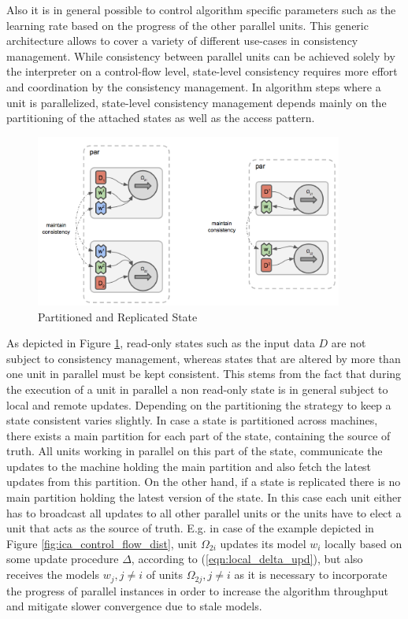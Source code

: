 Also it is in general possible to control algorithm specific parameters such as the learning rate based on the progress of the other parallel units.
This generic architecture allows to cover a variety of different use-cases in consistency management.
While consistency between parallel units can be achieved solely by the interpreter on a control-flow level, state-level consistency requires more effort and coordination by the consistency management.
In algorithm steps where a unit is parallelized, state-level consistency management depends mainly on the partitioning of the attached states as well as the access pattern.
\begin{figure}[ht]
\centering
\includegraphics[width=0.9\textwidth]{img/par_repl_model.png}
\caption{Partitioned and Replicated State}
\label{fig:par_repl_model}
\end{figure}
As depicted in Figure \ref{fig:par_repl_model}, read-only states such as the input data $D$ are not subject to consistency management, whereas states that are altered by more than one unit in parallel must be kept consistent.
This stems from the fact that during the execution of a unit in parallel a non read-only state is in general subject to local and remote updates.
Depending on the partitioning the strategy to keep a state consistent varies slightly.
In case a state is partitioned across machines, there exists a main partition for each part of the state, containing the source of truth.
All units working in parallel on this part of the state, communicate the updates to the machine holding the main partition and also fetch the latest updates from this partition.
On the other hand, if a state is replicated there is no main partition holding the latest version of the state.
In this case each unit either has to broadcast all updates to all other parallel units or the units have to elect a unit that acts as the source of truth.
E.g. in case of the example depicted in Figure \ref{fig:ica_control_flow_dist}, unit $\Omega_{2i}$ updates its model $w_i$ locally based on some update procedure $\Delta$, according to (\ref{eqn:local_delta_upd}), but also receives the models $w_j, j \neq i$ of units $\Omega_{2j}, j \neq i$ as it is necessary to incorporate the progress of parallel instances in order to increase the algorithm throughput and mitigate slower convergence due to stale models.

